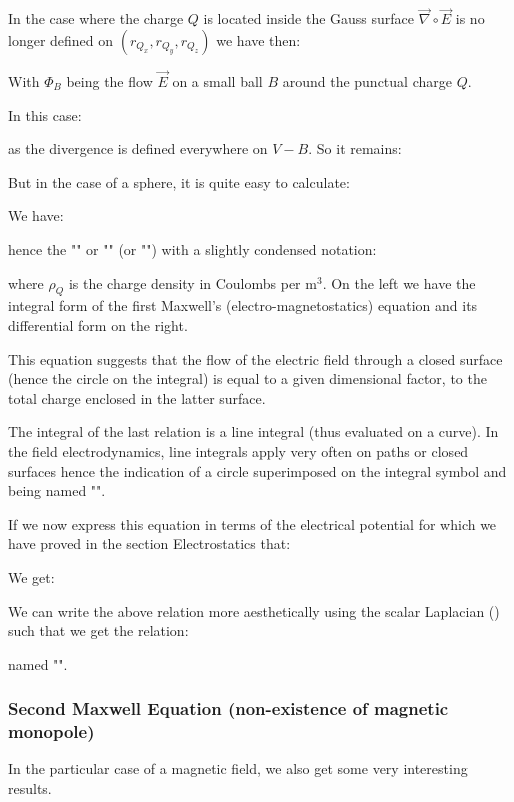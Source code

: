 	In the case where the charge $Q$ is located inside the Gauss surface $\vec{\nabla}\circ\vec{E}$ is no longer defined on $(r_{Q_x},r_{Q_y},r_{Q_z})$ we have then:
	
	With $\Phi_B$ being the flow $\vec{E}$ on a small ball  $B$ around the punctual charge $Q$.
	
	In this case:
	
	as the divergence is defined everywhere on $V-B$. So it remains:
	
	But in the case of a sphere, it is quite easy to calculate:
	
	We have:
	
	hence the "" or "\label{gauss law}" (or "") with a slightly condensed notation:
	
	where $\rho_Q$ is the charge density in Coulombs per $\text{m}^3$. On the left we have the integral form of the first Maxwell's (electro-magnetostatics) equation and its differential form on the right.
	
	This equation suggests that the flow of the electric field through a closed surface (hence the circle on the integral) is equal to a given dimensional factor, to the total charge enclosed in the latter surface.
	\begin{tcolorbox}[title=Remark,colframe=black,arc=10pt]
	The integral of the last relation is a line integral (thus evaluated on a curve). In the field electrodynamics, line integrals  apply very often on paths or closed surfaces hence the indication of a circle superimposed on the integral symbol and being named "".
	\end{tcolorbox}	
	If we now express this equation in terms of the electrical potential for which we have proved in the section Electrostatics that:
	
	We get:
	
	We can write the above relation more aesthetically using the scalar Laplacian () such that we get the relation:
	
	named "\label{maxwell-poisson equation}".
	
	\subsubsection{Second Maxwell Equation (non-existence of magnetic monopole)}
	In the particular case of a magnetic field, we also get some very interesting results.
	
